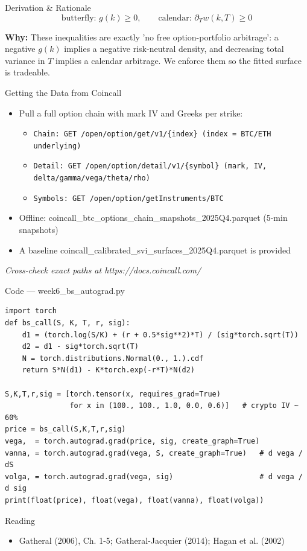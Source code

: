 \documentclass[aspectratio=169,10pt]{beamer}
\begin{document}
\begin{frame}{Derivation \& Rationale}
\[\text{butterfly: } g(k)\ge 0,\qquad \text{calendar: } \partial_T w(k,T)\ge 0\]

\small\textbf{\color{ncsured}Why:} These inequalities are exactly 'no free option-portfolio arbitrage': a negative $g(k)$ implies a negative risk-neutral density, and decreasing total variance in $T$ implies a calendar arbitrage. We enforce them so the fitted surface is tradeable.
\end{frame}

\begin{frame}{Getting the Data from Coincall}
\begin{itemize}
  \item Pull a full option chain with mark IV and Greeks per strike:
  \begin{itemize}\item \texttt{\small Chain:   GET /open/option/get/v1/\{index\}        (index = BTC/ETH underlying)}\end{itemize}
  \begin{itemize}\item \texttt{\small Detail:  GET /open/option/detail/v1/\{symbol\}    (mark, IV, delta/gamma/vega/theta/rho)}\end{itemize}
  \begin{itemize}\item \texttt{\small Symbols: GET /open/option/getInstruments/BTC}\end{itemize}
  \item Offline: coincall\_btc\_options\_chain\_snapshots\_2025Q4.parquet (5-min snapshots)
  \item A baseline coincall\_calibrated\_svi\_surfaces\_2025Q4.parquet is provided
\end{itemize}
\vspace{2pt}\tiny\textit{Cross-check exact paths at https://docs.coincall.com/}
\end{frame}

\begin{frame}[fragile]{Code --- week6\_bs\_autograd.py}
\begin{lstlisting}
import torch
def bs_call(S, K, T, r, sig):
    d1 = (torch.log(S/K) + (r + 0.5*sig**2)*T) / (sig*torch.sqrt(T))
    d2 = d1 - sig*torch.sqrt(T)
    N = torch.distributions.Normal(0., 1.).cdf
    return S*N(d1) - K*torch.exp(-r*T)*N(d2)

S,K,T,r,sig = [torch.tensor(x, requires_grad=True)
               for x in (100., 100., 1.0, 0.0, 0.6)]   # crypto IV ~ 60%
price = bs_call(S,K,T,r,sig)
vega,  = torch.autograd.grad(price, sig, create_graph=True)
vanna, = torch.autograd.grad(vega, S, create_graph=True)   # d vega / dS
volga, = torch.autograd.grad(vega, sig)                    # d vega / d sig
print(float(price), float(vega), float(vanna), float(volga))
\end{lstlisting}
\end{frame}
\begin{frame}{Reading}
\begin{itemize}
  \item Gatheral (2006), Ch. 1-5; Gatheral-Jacquier (2014); Hagan et al. (2002)
\end{itemize}
\end{frame}
\end{document}
